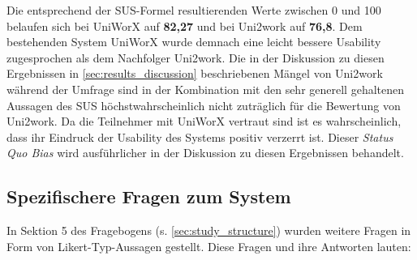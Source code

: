 \documentclass[11pt,a4paper,twoside,ngerman]{article}
\begin{document}
\noindent
Die entsprechend der SUS-Formel resultierenden Werte zwischen 0 und 100 belaufen sich bei UniWorX auf \textbf{82,27} und bei Uni2work auf \textbf{76,8}. Dem bestehenden System UniWorX wurde demnach eine leicht bessere Usability zugesprochen als dem Nachfolger Uni2work. Die in der Diskussion zu diesen Ergebnissen in \autoref{sec:results_discussion} beschriebenen Mängel von Uni2work während der Umfrage sind in der Kombination mit den sehr generell gehaltenen Aussagen des SUS höchstwahrscheinlich nicht zuträglich für die Bewertung von Uni2work. Da die Teilnehmer mit UniWorX vertraut sind ist es wahrscheinlich, dass ihr Eindruck der Usability des Systems positiv verzerrt ist. Dieser \textit{Status Quo Bias} wird ausführlicher in der Diskussion zu diesen Ergebnissen behandelt.

\subsection{Spezifischere Fragen zum System} \label{sec:results_likert}
In Sektion 5 des Fragebogens (s. \autoref{sec:study_structure}) wurden weitere Fragen in Form von Likert-Typ-Aussagen gestellt. Diese Fragen und ihre Antworten lauten:
\end{document}
